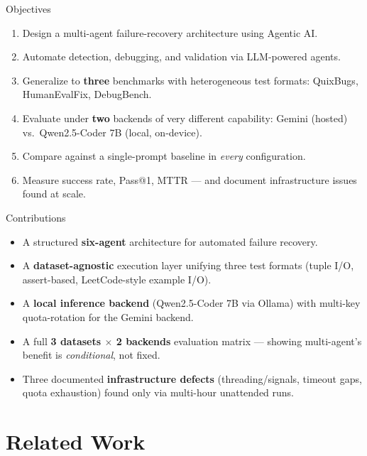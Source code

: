 \documentclass[aspectratio=169]{beamer}
\begin{document}
\begin{frame}{Objectives}
\begin{enumerate}
    \item Design a multi-agent failure-recovery architecture using Agentic AI.
    \item Automate detection, debugging, and validation via LLM-powered agents.
    \item Generalize to \textbf{three} benchmarks with heterogeneous test formats: QuixBugs, HumanEvalFix, DebugBench.
    \item Evaluate under \textbf{two} backends of very different capability: Gemini (hosted) vs.\ Qwen2.5-Coder 7B (local, on-device).
    \item Compare against a single-prompt baseline in \emph{every} configuration.
    \item Measure success rate, Pass@1, MTTR --- and document infrastructure issues found at scale.
\end{enumerate}
\end{frame}

\begin{frame}{Contributions}
\begin{itemize}
    \item A structured \textbf{six-agent} architecture for automated failure recovery.
    \item A \textbf{dataset-agnostic} execution layer unifying three test formats (tuple I/O, assert-based, LeetCode-style example I/O).
    \item A \textbf{local inference backend} (Qwen2.5-Coder 7B via Ollama) with multi-key quota-rotation for the Gemini backend.
    \item A full \textbf{3 datasets $\times$ 2 backends} evaluation matrix --- showing multi-agent's benefit is \emph{conditional}, not fixed.
    \item Three documented \textbf{infrastructure defects} (threading/signals, timeout gaps, quota exhaustion) found only via multi-hour unattended runs.
\end{itemize}
\end{frame}

\section{Related Work}
\end{document}
